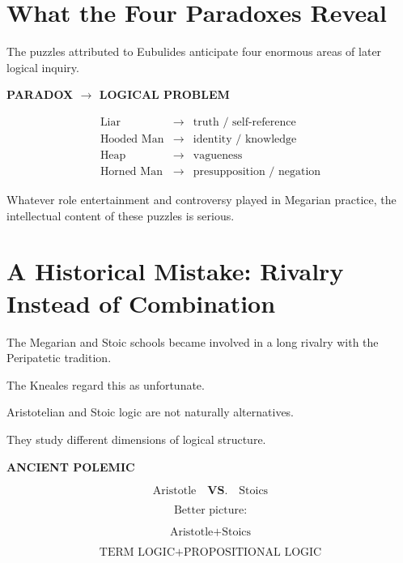 \documentclass[11pt]{article}
\begin{document}
\section{What the Four Paradoxes Reveal}

The puzzles attributed to Eubulides anticipate four enormous
areas of later logical inquiry.

\begin{whiteboard}
\textbf{PARADOX $\rightarrow$ LOGICAL PROBLEM}

\[
\begin{array}{rcl}
\text{Liar}
&\rightarrow&
\text{truth / self-reference}
\\[0.4em]
\text{Hooded Man}
&\rightarrow&
\text{identity / knowledge}
\\[0.4em]
\text{Heap}
&\rightarrow&
\text{vagueness}
\\[0.4em]
\text{Horned Man}
&\rightarrow&
\text{presupposition / negation}
\end{array}
\]
\end{whiteboard}

Whatever role entertainment and controversy played in Megarian
practice, the intellectual content of these puzzles is serious.

\section{A Historical Mistake: Rivalry Instead of Combination}

The Megarian and Stoic schools became involved in a long rivalry
with the Peripatetic tradition.

The Kneales regard this as unfortunate.

Aristotelian and Stoic logic are not naturally alternatives.

They study different dimensions of logical structure.

\begin{whiteboard}
\textbf{ANCIENT POLEMIC}

\[
\text{Aristotle}
\quad\mathbf{VS.}\quad
\text{Stoics}
\]

\[
\text{Better picture:}
\]

\[
\boxed{
\text{Aristotle}
+
\text{Stoics}
}
\]

\[
\text{TERM LOGIC}
+
\text{PROPOSITIONAL LOGIC}
\]
\end{whiteboard}
\end{document}
